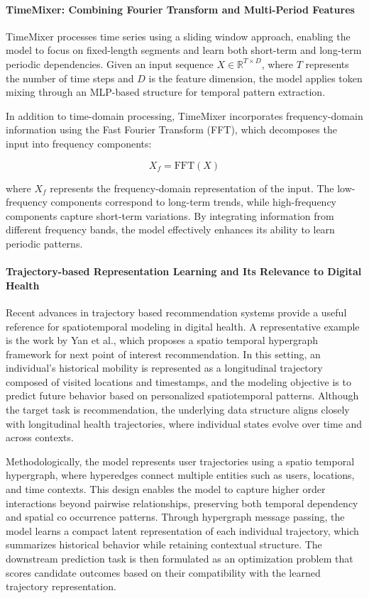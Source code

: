 \documentclass[acmsmall]{acmart}
\begin{document}
\paragraph{TimeMixer: Combining Fourier Transform and Multi-Period Features}TimeMixer \cite{timemixer} processes time series using a sliding window approach, enabling the model to focus on fixed-length segments and learn both short-term and long-term periodic dependencies. Given an input sequence $X \in \mathbb{R}^{T \times D}$, where $T$ represents the number of time steps and $D$ is the feature dimension, the model applies token mixing through an MLP-based structure for temporal pattern extraction.

In addition to time-domain processing, TimeMixer incorporates frequency-domain information using the Fast Fourier Transform (FFT), which decomposes the input into frequency components:

\begin{equation}
X_f = \text{FFT}(X)
\end{equation}

where $X_f$ represents the frequency-domain representation of the input. The low-frequency components correspond to long-term trends, while high-frequency components capture short-term variations. By integrating information from different frequency bands, the model effectively enhances its ability to learn periodic patterns.

\paragraph{Trajectory-based Representation Learning and Its Relevance to Digital Health}
Recent advances in trajectory based recommendation systems provide a useful reference for spatiotemporal modeling in digital health. A representative example is the work by Yan et al., which proposes a spatio temporal hypergraph framework for next point of interest recommendation. In this setting, an individual’s historical mobility is represented as a longitudinal trajectory composed of visited locations and timestamps, and the modeling objective is to predict future behavior based on personalized spatiotemporal patterns. Although the target task is recommendation, the underlying data structure aligns closely with longitudinal health trajectories, where individual states evolve over time and across contexts.

Methodologically, the model represents user trajectories using a spatio temporal hypergraph, where hyperedges connect multiple entities such as users, locations, and time contexts. This design enables the model to capture higher order interactions beyond pairwise relationships, preserving both temporal dependency and spatial co occurrence patterns. Through hypergraph message passing, the model learns a compact latent representation of each individual trajectory, which summarizes historical behavior while retaining contextual structure. The downstream prediction task is then formulated as an optimization problem that scores candidate outcomes based on their compatibility with the learned trajectory representation.
\end{document}
